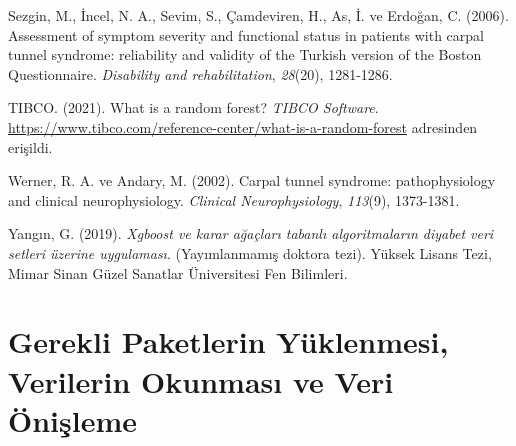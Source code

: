 \documentclass[12pt,twoside]{deuthesis}
\begin{document}
\begin{CSLReferences}{1}{0}
\leavevmode{}%
Sezgin, M., İncel, N. A., Sevim, S., Çamdeviren, H., As, İ. ve Erdoğan, C. (2006). Assessment of symptom severity and functional status in patients with carpal tunnel syndrome: reliability and validity of the Turkish version of the Boston Questionnaire. \emph{Disability and rehabilitation}, \emph{28}(20), 1281-1286.

\leavevmode{}%
TIBCO. (2021). What is a random forest? \emph{TIBCO Software}. \url{https://www.tibco.com/reference-center/what-is-a-random-forest} adresinden erişildi.

\leavevmode{}%
Werner, R. A. ve Andary, M. (2002). Carpal tunnel syndrome: pathophysiology and clinical neurophysiology. \emph{Clinical Neurophysiology}, \emph{113}(9), 1373-1381.

\leavevmode{}%
Yangın, G. (2019). \emph{Xgboost ve karar ağaçları tabanlı algoritmaların diyabet veri setleri üzerine uygulaması}. (Yayımlanmamış doktora tezi). Yüksek Lisans Tezi, Mimar Sinan Güzel Sanatlar Üniversitesi Fen Bilimleri.

\end{CSLReferences}
\setlength{\parindent}{-0.20in}
\setlength{\leftskip}{0.20in}
\setlength{\parskip}{8pt}

\appendix

\hypertarget{gerekli-paketlerin-yuxfcklenmesi-verilerin-okunmasux131-ve-veri-uxf6niux15fleme}{%
\chapter{Gerekli Paketlerin Yüklenmesi, Verilerin Okunması ve Veri Önişleme}\label{gerekli-paketlerin-yuxfcklenmesi-verilerin-okunmasux131-ve-veri-uxf6niux15fleme}}
\end{document}
